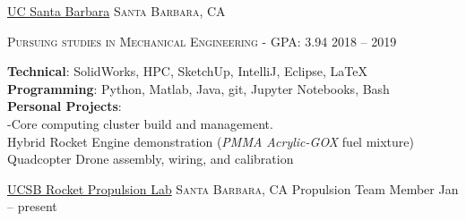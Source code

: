 \documentclass[12pt]{article}
\begin{document}
	\headedsection
	{\href{https://engineering.ucsb.edu/}{UC Santa Barbara}}
	{\textsc{Santa Barbara, CA}} {%
		\headedsubsection
		{\textsc{Pursuing studies in Mechanical Engineering - GPA:} 3.94}
		{2018 -- 2019}{}
		\vspace{-.2em}
		
		
		
	}
	
	\spacedhrule{-0.5em}{-0.5em}
	
	
	\textbf{Technical}: SolidWorks, HPC, SketchUp, IntelliJ, Eclipse, \LaTeX\\
	\textbf{Programming}: Python, Matlab, Java, git, Jupyter Notebooks, Bash\\
	\textbf{Personal Projects}:\\
	-Core computing cluster build and management. \\
	\sbull Hybrid Rocket Engine demonstration (\textit{PMMA Acrylic-GOX} fuel mixture)\\
	\sbull Quadcopter Drone assembly, wiring, and calibration\\
	
	
	\spacedhrule{-0.4em}{-0.6em}
	
	\headedsection  %
	{\href{http://www.rplatucsb.com/}{UCSB Rocket Propulsion Lab}}
	{\textsc{Santa Barbara, CA}} {
		\headedsubsection
		{Propulsion Team Member}
		{Jan  -- present}
		{}
	}
\end{document}
